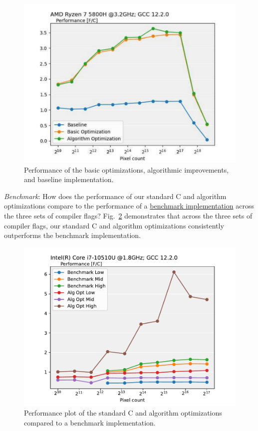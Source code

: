\documentclass[letterpaper]{article}
\begin{document}
\begin{figure}[htb]
\centering
  \includegraphics[scale=0.5]{PerfBasic.pdf}
  \caption{Performance of the basic optimizations, algorithmic improvements, and baseline implementation.
  \label{perfBase}}
\end{figure}

\textit{Benchmark}: How does the performance of our standard C and algorithm optimizations compare to the performance of a \href{https://github.com/AirGuanZ/ImageQuilting}{benchmark implementation} across the three sets of compiler flags? Fig.~\ref{BenchmarkPerformance} demonstrates that across the three sets of compiler flags, our standard C and algorithm optimizations consistently outperforms the benchmark implementation.

\begin{figure}[htb]
\centering
  \includegraphics[scale=0.5]{BenchmarkPerformance.pdf}
  \caption{Performance plot of the standard C and algorithm optimizations compared to a benchmark implementation.
  \label{BenchmarkPerformance}}
\end{figure}
\end{document}
